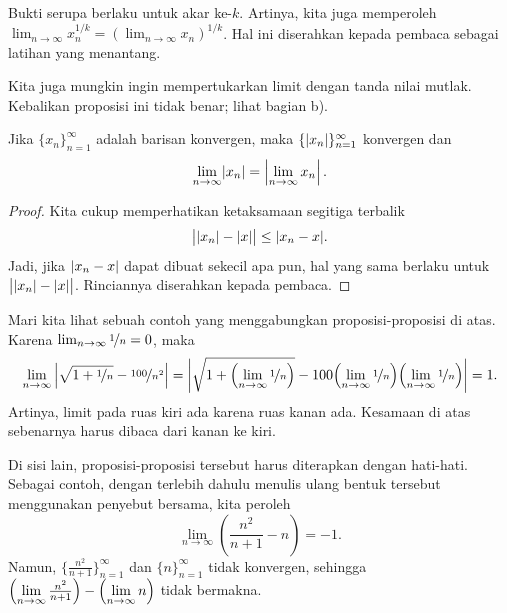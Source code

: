 Bukti serupa berlaku untuk akar ke-$k$.  Artinya, kita juga
memperoleh
$\lim_{n\to\infty} x_n^{1/k} = {( \lim_{n\to\infty} x_n )}^{1/k}$.  Hal ini diserahkan kepada pembaca
sebagai latihan yang menantang.

Kita juga mungkin ingin mempertukarkan limit dengan tanda nilai mutlak.
Kebalikan proposisi ini tidak benar; lihat
 bagian b).

\begin{prop}
Jika $\{ x_n \}_{n=1}^\infty$ adalah barisan konvergen, maka $\{ \lvert {x_n} \rvert \}_{n=1}^\infty$
konvergen dan
\begin{equation*}
\lim_{n\to\infty} \lvert {x_n} \rvert = 
\left\lvert {\lim_{n\to\infty} x_n} \right\rvert .
\end{equation*}
\end{prop}

\begin{proof}
Kita cukup memperhatikan ketaksamaan segitiga terbalik
\begin{equation*}
\big\lvert \lvert {x_n} \rvert - \lvert {x} \rvert \big\rvert \leq \lvert {x_n-x} \rvert .
\end{equation*}
Jadi, jika $\lvert {x_n -x} \rvert$ dapat dibuat sekecil apa pun, hal yang sama berlaku untuk
$\big\lvert \lvert {x_n} \rvert - \lvert {x} \rvert \big\rvert$.
Rinciannya diserahkan kepada pembaca.
\end{proof}

Mari kita lihat sebuah contoh yang menggabungkan proposisi-proposisi di atas.  Karena
$\lim_{n\to\infty} \nicefrac{1}{n} = 0$, maka
\begin{equation*}
\lim_{n\to \infty}
\left\lvert {\sqrt{1 + \nicefrac{1}{n}} - \nicefrac{100}{n^2}} \right\rvert =  
\left\lvert {\sqrt{1 + \Bigl(\lim_{n\to\infty} \nicefrac{1}{n}\Bigr)}
- 100 \Bigl(\lim_{n\to\infty} \nicefrac{1}{n}\Bigr)\Bigl(\lim_{n\to\infty} \nicefrac{1}{n}\Bigr)} \right\rvert = 1.
\end{equation*}
Artinya, limit pada ruas kiri ada karena ruas kanan
ada.  Kesamaan di atas sebenarnya harus dibaca dari kanan ke kiri.

Di sisi lain, proposisi-proposisi tersebut harus diterapkan dengan hati-hati.
Sebagai contoh, dengan terlebih dahulu menulis ulang bentuk tersebut menggunakan penyebut bersama,
kita peroleh
\begin{equation*}
\lim_{n\to \infty} \left( \frac{n^2}{n+1} - n \right)
= -1 .
\end{equation*}
Namun, 
$\bigl\{ \frac{n^2}{n+1} \bigr\}_{n=1}^\infty$ dan 
$\{n\}_{n=1}^\infty$ tidak konvergen,
sehingga
$\Bigl(\lim\limits_{n\to\infty} \frac{n^2}{n+1}\Bigr) -
\Bigl(\lim\limits_{n\to\infty} n\Bigr)$ tidak bermakna.

